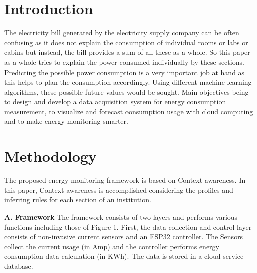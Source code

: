 \documentclass[journal]{IEEEtran}
\begin{document}
\section{Introduction}
\IEEEPARstart The electricity bill generated by the electricity supply company can be often confusing as it does not explain the consumption of individual rooms or labs or cabins but instead, the bill provides a sum of all these as a whole. So this paper as a whole tries to explain the power consumed individually by these sections. Predicting the possible power consumption is a very important job at hand as this helps to plan the consumption accordingly. Using different machine learning algorithms, these possible future values would be sought. Main objectives being to design and develop a data acquisition system for energy consumption measurement, to visualize and forecast consumption usage with cloud computing and to make energy monitoring smarter.

\section{Methodology}
  The proposed energy monitoring framework is based on Context-awareness. In this paper, Context-awareness is accomplished considering the profiles and inferring rules for each section of an institution.
  \newline
 
\textbf{A. Framework}
\newline
The framework consists of two layers and performs various functions including those of Figure 1. First, the data collection and control layer consists of non-invasive current sensors and an ESP32 controller. The Sensors collect the current usage (in Amp) and the controller performs energy consumption data calculation (in KWh). The data is stored in a cloud service database. 
 
\end{document}
